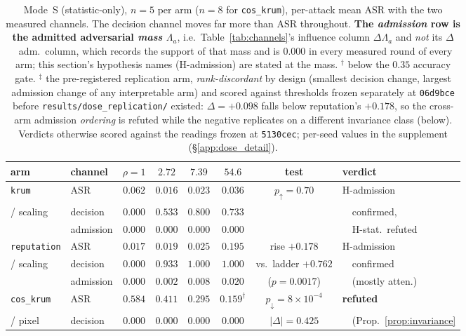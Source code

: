 \documentclass{article}
\begin{document}
\begin{table}[h]
\caption{Mode~S (statistic-only), $n{=}5$ per arm ($n{=}8$ for \texttt{cos\_krum}), per-attack mean ASR with the two measured channels. The decision channel moves far more than ASR throughout. \textbf{The \emph{admission} row is the admitted adversarial \emph{mass} $\Lambda_a$}, i.e.\ Table~\ref{tab:channels}'s influence column $\Delta\Lambda_a$ and \emph{not} its $\Delta$~adm.\ column, which records the support of that mass and is $0.000$ in every measured round of every arm; this section's hypothesis names (H-admission) are stated at the mass. $^{\dagger}$ below the $0.35$ accuracy gate. $^{\ddagger}$ the pre-registered replication arm, \emph{rank-discordant} by design (smallest decision change, largest admission change of any interpretable arm) and scored against thresholds frozen separately at \texttt{06d9bce} before \texttt{results/dose\_replication/} existed: $\Delta{=}{+}0.098$ falls below reputation's $+0.178$, so the cross-arm admission \emph{ordering} is refuted while the negative replicates on a different invariance class (below). Verdicts otherwise scored against the readings frozen at \texttt{5130cec}; per-seed values in the supplement (§\ref{app:dose_detail}).}
\label{tab:targeted}
\centering\scriptsize\setlength{\tabcolsep}{4pt}
\begin{tabular}{llcccccl}
\toprule
\textbf{arm} & \textbf{channel} & $\rho{=}1$ & $2.72$ & $7.39$ & $54.6$ & \textbf{test} & \textbf{verdict} \\
\midrule
\texttt{krum} & ASR & $0.062$ & $0.016$ & $0.023$ & $0.036$ & $p_{\uparrow}{=}0.70$ & H-admission \\
/ scaling & decision & $0.000$ & $0.533$ & $0.800$ & $0.733$ & & \ \ confirmed, \\
 & admission & $0.000$ & $0.000$ & $0.000$ & $0.000$ & & \ \ H-stat.\ refuted \\
\midrule
\texttt{reputation} & ASR & $0.017$ & $0.019$ & $0.025$ & $0.195$ & rise $+0.178$ & H-admission \\
/ scaling & decision & $0.000$ & $0.933$ & $1.000$ & $1.000$ & vs.\ ladder $+0.762$ & \ \ confirmed \\
 & admission & $0.000$ & $0.002$ & $0.008$ & $0.020$ & ($p{=}0.0017$) & \ \ (mostly atten.) \\
\midrule
\texttt{cos\_krum} & ASR & $0.584$ & $0.411$ & $0.295$ & $0.159^{\dagger}$ & $p_{\downarrow}{=}8{\times}10^{-4}$ & \textbf{refuted} \\
/ pixel & decision & $0.000$ & $0.000$ & $0.000$ & $0.000$ & $|\Delta|{=}0.425$ & \ \ (Prop.~\ref{prop:invariance} \\

\end{tabular}
\end{table}
\end{document}
